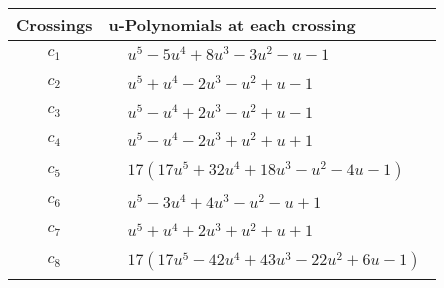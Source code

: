 \documentclass[1p]{elsarticle_modified}
\theoremstyle{definition}
\begin{document}
\begin{tabular}{m{50pt}|m{274pt}}
Crossings & \hspace{64pt}u-Polynomials at each crossing \\
\hline $$\begin{aligned}c_{1}\end{aligned}$$&$\begin{aligned}
&u^5-5 u^4+8 u^3-3 u^2- u-1
\end{aligned}$\\
\hline $$\begin{aligned}c_{2}\end{aligned}$$&$\begin{aligned}
&u^5+u^4-2 u^3- u^2+u-1
\end{aligned}$\\
\hline $$\begin{aligned}c_{3}\end{aligned}$$&$\begin{aligned}
&u^5- u^4+2 u^3- u^2+u-1
\end{aligned}$\\
\hline $$\begin{aligned}c_{4}\end{aligned}$$&$\begin{aligned}
&u^5- u^4-2 u^3+u^2+u+1
\end{aligned}$\\
\hline $$\begin{aligned}c_{5}\end{aligned}$$&$\begin{aligned}
&17(17 u^5+32 u^4+18 u^3- u^2-4 u-1)
\end{aligned}$\\
\hline $$\begin{aligned}c_{6}\end{aligned}$$&$\begin{aligned}
&u^5-3 u^4+4 u^3- u^2- u+1
\end{aligned}$\\
\hline $$\begin{aligned}c_{7}\end{aligned}$$&$\begin{aligned}
&u^5+u^4+2 u^3+u^2+u+1
\end{aligned}$\\
\hline $$\begin{aligned}c_{8}\end{aligned}$$&$\begin{aligned}
&17(17 u^5-42 u^4+43 u^3-22 u^2+6 u-1)
\end{aligned}$\\

\end{tabular}
\end{document}
